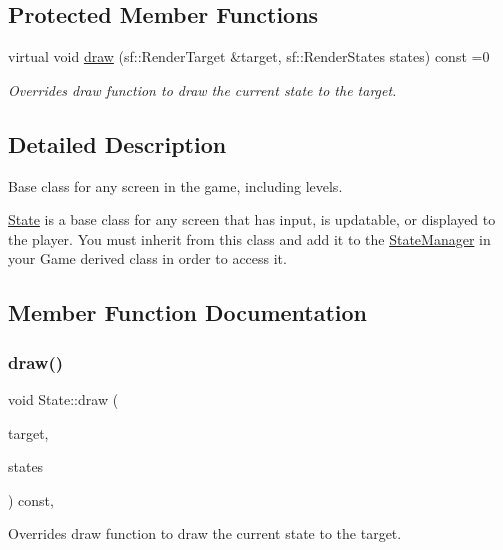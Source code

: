 \subsection*{Protected Member Functions}
\begin{DoxyCompactItemize}
\item 
virtual void \mbox{\hyperlink{class_state_a7e115388c37a05ee165a395f3119d685}{draw}} (sf\+::\+Render\+Target \&target, sf\+::\+Render\+States states) const =0
\begin{DoxyCompactList}\small\item\em Overrides draw function to draw the current state to the target. \end{DoxyCompactList}\end{DoxyCompactItemize}


\subsection{Detailed Description}
Base class for any screen in the game, including levels. 

\mbox{\hyperlink{class_state}{State}} is a base class for any screen that has input, is updatable, or displayed to the player. You must inherit from this class and add it to the \mbox{\hyperlink{class_state_manager}{State\+Manager}} in your Game derived class in order to access it. 

\subsection{Member Function Documentation}
\mbox{\label{class_state_a7e115388c37a05ee165a395f3119d685}} 
\subsubsection{\texorpdfstring{draw()}{draw()}}
{\footnotesize\ttfamily void State\+::draw (\begin{DoxyParamCaption}\item[{sf\+::\+Render\+Target \&}]{target,  }\item[{sf\+::\+Render\+States}]{states }\end{DoxyParamCaption}) const\hspace{0.3cm}{\ttfamily [protected]}, {}}



Overrides draw function to draw the current state to the target. 


